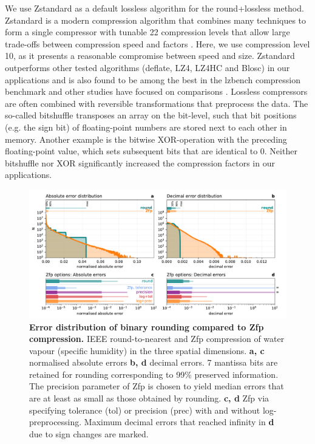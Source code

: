 We use Zstandard as a default lossless algorithm for the round+lossless method. Zstandard is a modern compression algorithm
that combines many techniques to form a single compressor with tunable 22 compression levels that allow large trade-offs between
compression speed and factors \citep{Skibinski2020,Collet2020}. Here, we use compression level 10, as it presents a reasonable
compromise between speed and size. Zstandard outperforms other tested algorithms (deflate, LZ4, LZ4HC and Blosc) in our
applications and is also found to be among the best in the lzbench compression benchmark \citep{Skibinski2020} and other studies
have focused on comparisons \citep{Delaunay2019}. Lossless compressors
are often combined with reversible transformations that preprocess the data. The so-called bitshuffle transposes an array on the
bit-level, such that bit positions (e.g. the sign bit) of floating-point numbers are stored next to each other in memory. Another example
is the bitwise XOR-operation \citep{Pelkonen2015a} with the preceding floating-point value, which sets subsequent bits that are identical
to 0. Neither bitshuffle nor XOR significantly increased the compression factors in our applications.

\begin{figure}[tbhp]
	\includegraphics[width=1\textwidth]{Figures/compression/error_distributions.pdf}
	\caption{\textbf{Error distribution of binary rounding compared to Zfp compression.} 
	IEEE round-to-nearest and Zfp compression of water vapour (specific humidity) in the
	three spatial dimensions. \textbf{a, c} normalised absolute errors \textbf{b, d} decimal errors.
	7 mantissa bits are retained for rounding corresponding to 99\% preserved information.
	The precision parameter of Zfp is chosen to yield median errors that are at least as small
	as those obtained by rounding. \textbf{c, d} Zfp via specifying tolerance (tol) or precision (prec)
	with and without log-preprocessing. Maximum decimal errors that reached infinity in \textbf{d}
	due to sign changes are marked.}
	\label{fig:compression_error_distribution}
\end{figure}

